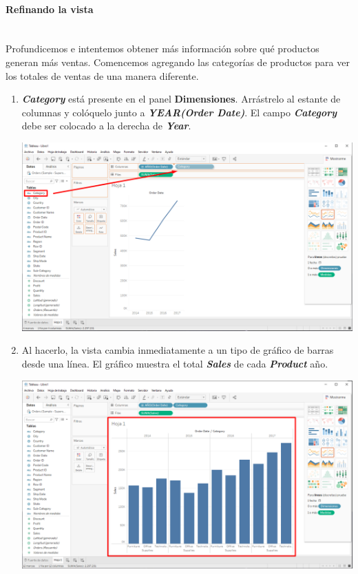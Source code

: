 \documentclass[12pt,letterpaper]{article}
\begin{document}
    \paragraph{\Large Refinando la vista\\ \\}
    Profundicemos e intentemos obtener más información sobre qué productos generan más ventas. Comencemos agregando las categorías de productos para ver los totales de ventas de una manera diferente.
    \begin{enumerate}
        \item \textit{\textbf{Category}} está presente en el panel \textbf{Dimensiones}. Arrástrelo al estante de columnas y colóquelo junto a \textit{\textbf{YEAR(Order Date)}}. El campo \textit{\textbf{Category}} debe ser colocado a la derecha de \textit{\textbf{Year}}.
        \begin{center}
            \includegraphics[width=15cm]{./img/img12.png}
        \end{center}
        \item Al hacerlo, la vista cambia inmediatamente a un tipo de gráfico de barras desde una línea. El gráfico muestra el total \textit{\textbf{Sales}} de cada \textit{\textbf{Product}} año.
        \begin{center}
            \includegraphics[width=15cm]{./img/img13.png}

\end{center}
\end{enumerate}
\end{document}
